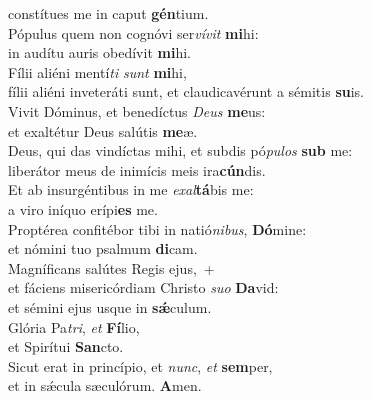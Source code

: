 \oddverse constítues me in caput \textbf{gén}tium.\\
\evenverse Pópulus quem non cognóvi ser\textit{ví}\textit{vit} \textbf{mi}hi:~\*\\
\evenverse in audítu auris obedívit \textbf{mi}hi.\\
\oddverse Fílii aliéni mentí\textit{ti} \textit{sunt} \textbf{mi}hi,~\*\\
\oddverse fílii aliéni inveteráti sunt, et claudicavérunt a sémitis \textbf{su}is.\\
\evenverse Vivit Dóminus, et benedíctus \textit{De}\textit{us} \textbf{me}us:~\*\\
\evenverse et exaltétur Deus salútis \textbf{me}æ.\\
\oddverse Deus, qui das vindíctas mihi, et subdis pó\textit{pu}\textit{los} \textbf{sub} me:~\*\\
\oddverse liberátor meus de inimícis meis ira\textbf{cún}dis.\\
\evenverse Et ab insurgéntibus in me \textit{e}\textit{xal}\textbf{tá}bis me:~\*\\
\evenverse a viro iníquo erípi\textbf{es} me.\\
\oddverse Proptérea confitébor tibi in natió\textit{ni}\textit{bus}, \textbf{Dó}mine:~\*\\
\oddverse et nómini tuo psalmum \textbf{di}cam.\\
\evenverse Magníficans salútes Regis ejus,~+\\
\evenverse  et fáciens misericórdiam Christo \textit{su}\textit{o} \textbf{Da}vid:~\*\\
\evenverse et sémini ejus usque in \textbf{sǽ}culum.\\
\oddverse Glória Pa\textit{tri}, \textit{et} \textbf{Fí}lio,~\*\\
\oddverse et Spirítui \textbf{San}cto.\\
\evenverse Sicut erat in princípio, et \textit{nunc}, \textit{et} \textbf{sem}per,~\*\\
\evenverse et in sǽcula sæculórum. \textbf{A}men.\\
